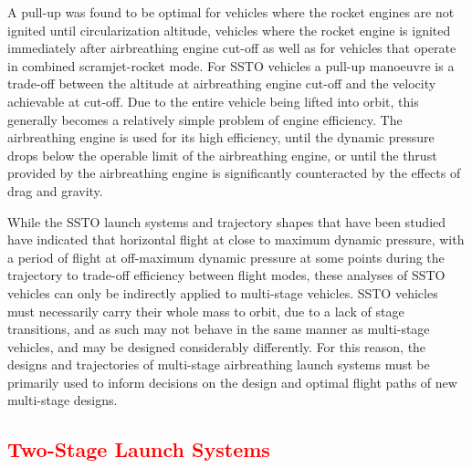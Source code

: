 A pull-up was found to be optimal for vehicles where the rocket engines are not ignited until circularization altitude\cite{Powell1991,Lu1993}, vehicles where the rocket engine is ignited immediately after airbreathing engine cut-off\cite{Trefny1999,Roche2000,Pescetelli2012} as well as for vehicles that operate in combined scramjet-rocket mode\cite{Young2006,Bradford2000}.
For SSTO vehicles a pull-up manoeuvre is a trade-off between the altitude at airbreathing engine cut-off and the velocity achievable at cut-off. Due to the entire vehicle being lifted into orbit, this generally becomes a relatively simple problem of engine efficiency. The airbreathing engine is used for its high efficiency, until the dynamic pressure drops below the operable limit of the airbreathing engine, or until the thrust provided by the airbreathing engine is significantly counteracted by the effects of drag and gravity. 

While the SSTO launch systems and trajectory shapes that have been studied have indicated that horizontal flight at close to maximum dynamic pressure, with a period of flight at off-maximum dynamic pressure at some points during the trajectory to trade-off efficiency between flight modes, these analyses of SSTO vehicles can only be indirectly applied to multi-stage vehicles. SSTO vehicles must necessarily carry their whole mass to orbit, due to a lack of stage transitions, and as such may not behave in the same manner as multi-stage vehicles, and may be designed considerably differently. For this reason, the designs and trajectories of multi-stage airbreathing launch systems must be primarily used to inform decisions on the design and optimal flight paths of new multi-stage designs. 
  	
  \textcolor{red}{
  \subsection{Two-Stage Launch Systems} \label{sec:twostagelaunchers}
}



